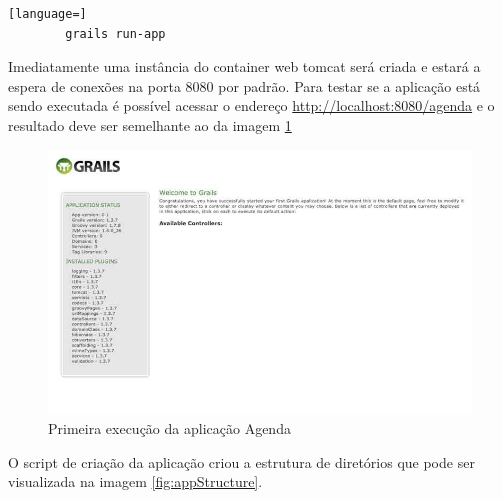 \documentclass[12pt]{article}
\begin{document}
    \begin{lstlisting}[language=]
        grails run-app
    \end{lstlisting}
    
    Imediatamente uma instância do container web tomcat será criada e estará a
    espera de conexões na porta 8080 por padrão. Para testar se a aplicação está
    sendo executada é possível acessar o endereço \url{http://localhost:8080/agenda} 
    e o resultado deve ser semelhante ao da imagem \ref{fig:firstRun}
    
    \begin{figure}[h!]
    \centering
    \includegraphics[width=1\textwidth]{images/firstRun.jpg}
    \caption{Primeira execução da aplicação Agenda}
    \label{fig:firstRun}
    \end{figure}
    
    O script de criação da aplicação criou a estrutura de diretórios que pode ser
    visualizada na imagem \ref{fig:appStructure}.
    
\end{document}

